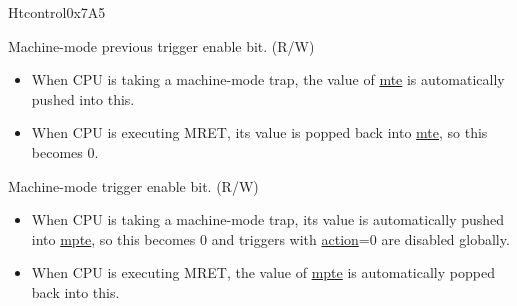 \begin{register}{H}{tcontrol}{0x7A5}\label{regdesc:TCONTROL}
%
%
%
%
\regnewline%
\begin{regdesc}\begin{reglist}
\label{fielddesc:TCONTROLMPTE}\item [mpte] Machine-mode previous trigger enable bit. (R/W)
\begin{itemize}
    \setlength\itemsep{-1em}
    \item When CPU is taking a machine-mode trap, the value of \hyperref[fielddesc:TCONTROLMTE]{mte} is automatically pushed into this.
    \item When CPU is executing MRET, its value is popped back into \hyperref[fielddesc:TCONTROLMTE]{mte}, so this becomes 0.
\end{itemize}
\label{fielddesc:TCONTROLMTE}\item [mte] Machine-mode trigger enable bit. (R/W)
\begin{itemize}
    \setlength\itemsep{-1em}
    \item When CPU is taking a machine-mode trap, its value is automatically pushed into \hyperref[fielddesc:TCONTROLMPTE]{mpte}, so this becomes 0 and triggers with \hyperref[fielddesc:MCONTROLACTION]{action}=0 are disabled globally.
    \item When CPU is executing MRET, the value of \hyperref[fielddesc:TCONTROLMPTE]{mpte} is automatically popped back into this.
\end{itemize}
\end{reglist}\end{regdesc}
\end{register}

